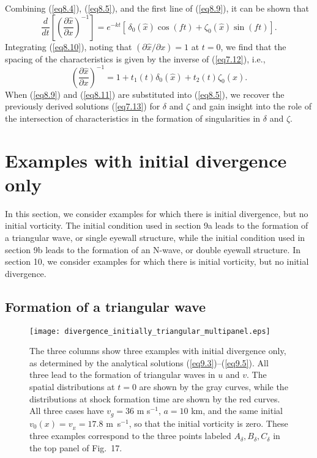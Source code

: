 \documentclass[10pt]{article}
\begin{document}
Combining (\ref{eq8.4}), (\ref{eq8.5}), and the first line of (\ref{eq8.9}), it
can be shown that
\begin{equation}                                    %
     \frac{d}{dt}\left[\left(\frac{\partial\hat{x}}{\partial x}\right)^{-1}\right]
         = e^{-kt}\left[\,\delta_0(\hat{x})\cos(ft)
                        + \zeta_0 (\hat{x})\sin(ft)\right].
\label{eq8.10}
\end{equation}
Integrating (\ref{eq8.10}), noting that $(\partial\hat{x}/\partial x)=1$ at $t=0$,
we find that the spacing of the characteristics is given by the inverse of
(\ref{eq7.12}), i.e.,
\begin{equation}                                    %
     \left(\frac{\partial\hat{x}}{\partial x}\right)^{-1}
     = 1 + t_1(t)\delta_0(\hat{x}) + t_2(t)\zeta_0(\hat{x}).
\label{eq8.11}
\end{equation}
When (\ref{eq8.9}) and (\ref{eq8.11}) are substituted into (\ref{eq8.5}), we
recover the previously derived solutions (\ref{eq7.13}) for $\delta$ and $\zeta$
and gain insight into the role of the intersection of characteristics in the
formation of singularities in $\delta$ and $\zeta$.




\section{Examples with initial divergence only}  %


     In this section, we consider examples for which there is initial
divergence, but no initial vorticity. The initial condition used in
section 9a leads to the formation of a triangular wave, or single
eyewall structure, while the initial condition used in section 9b
leads to the formation of an N-wave, or double eyewall structure.
In section 10, we consider examples for which there is initial vorticity,
but no initial divergence.


\subsection{Formation of a triangular wave}

\begin{figure*}[!t]                   %
\centerline{\texttt{[image: divergence\_initially\_triangular\_multipanel.eps]}}
\caption{The three columns show three examples with initial divergence only,
as determined by the analytical solutions (\ref{eq9.3})--(\ref{eq9.5}). All three
lead to the formation of triangular waves in $u$ and $v$. The
spatial distributions at $t=0$ are shown by the gray curves, while the distributions
at shock formation time are shown by the red curves. All three cases have
$v_g=36$ m s$^{-1}$, $a=10$ km, and the same initial $v_0(x)=v_{_E}=17.8$ m~s$^{-1}$,
so that the initial vorticity is zero. These three examples correspond to the three
points labeled $A_\delta,B_\delta,C_\delta$ in the top panel of Fig.~17.}
\end{figure*}
\end{document}
